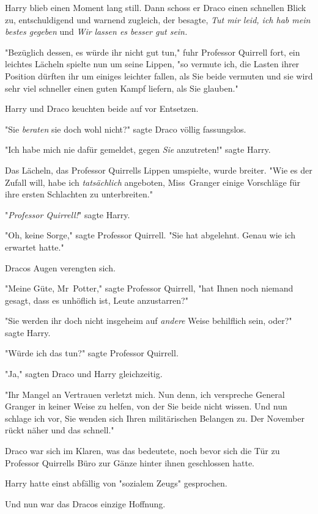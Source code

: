 {Harry blieb einen Moment lang still. Dann schoss er Draco einen schnellen Blick zu, entschuldigend und warnend zugleich, der besagte, \emph{Tut mir leid, ich hab mein bestes gegeben} und \emph{Wir} \emph{lassen es besser gut sein.}

"Bezüglich dessen, es würde ihr nicht gut tun," fuhr Professor Quirrell fort, ein leichtes Lächeln spielte nun um seine Lippen, "so vermute ich, die Lasten ihrer Position dürften ihr um einiges leichter fallen, als Sie beide vermuten und sie wird sehr viel schneller einen guten Kampf liefern, als Sie glauben."

Harry und Draco keuchten beide auf vor Entsetzen.

"Sie \emph{beraten} sie doch wohl nicht?" sagte Draco völlig fassungslos.

"Ich habe mich nie dafür gemeldet, gegen \emph{Sie} anzutreten!" sagte Harry.

Das Lächeln, das Professor Quirrells Lippen umspielte, wurde breiter. "Wie es der Zufall will, habe ich \emph{tatsächlich} angeboten, Miss~Granger einige Vorschläge für ihre ersten Schlachten zu unterbreiten."

"\emph{Professor Quirrell!}" sagte Harry.

"Oh, keine Sorge," sagte Professor Quirrell. "Sie hat abgelehnt. Genau wie ich erwartet hatte."

Dracos Augen verengten sich.

"Meine Güte, Mr~Potter," sagte Professor Quirrell, "hat Ihnen noch niemand gesagt, dass es unhöflich ist, Leute anzustarren?"

"Sie werden ihr doch nicht insgeheim auf \emph{andere} Weise behilflich sein, oder?" sagte Harry.

"Würde ich das tun?" sagte Professor Quirrell.

"Ja," sagten Draco und Harry gleichzeitig.

"Ihr Mangel an Vertrauen verletzt mich. Nun denn, ich verspreche General Granger in keiner Weise zu helfen, von der Sie beide nicht wissen. Und nun schlage ich vor, Sie wenden sich Ihren militärischen Belangen zu. Der November rückt näher und das schnell."

\later

Draco war sich im Klaren, was das bedeutete, noch bevor sich die Tür zu Professor Quirrells Büro zur Gänze hinter ihnen geschlossen hatte.

Harry hatte einst abfällig von "sozialem Zeugs" gesprochen.

Und nun war das Dracos einzige Hoffnung.

}
